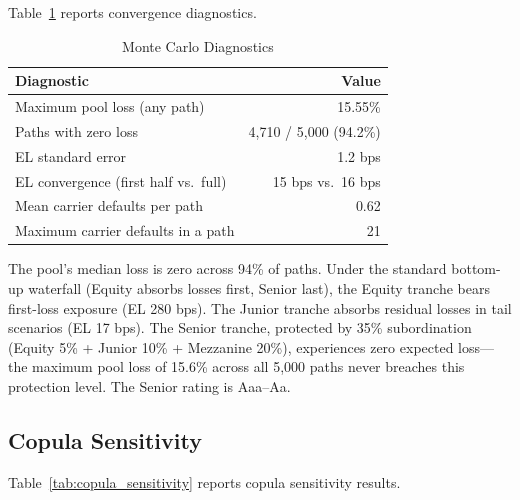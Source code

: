\documentclass[12pt,a4paper]{article}
\begin{document}
Table~\ref{tab:mc_diagnostics} reports convergence diagnostics.

\begin{table}[H]
\centering
\caption{Monte Carlo Diagnostics}
\label{tab:mc_diagnostics}
\begin{tabular}{lr}
\toprule
\textbf{Diagnostic} & \textbf{Value} \\
\midrule
Maximum pool loss (any path) & 15.55\% \\
Paths with zero loss & 4,710 / 5,000 (94.2\%) \\
EL standard error & 1.2 bps \\
EL convergence (first half vs.\ full) & 15 bps vs.\ 16 bps \\
Mean carrier defaults per path & 0.62 \\
Maximum carrier defaults in a path & 21 \\
\bottomrule
\end{tabular}
\end{table}

The pool's median loss is zero across 94\% of paths. Under the standard bottom-up waterfall (Equity absorbs losses first, Senior last), the Equity tranche bears first-loss exposure (EL 280 bps). The Junior tranche absorbs residual losses in tail scenarios (EL 17 bps). The Senior tranche, protected by 35\% subordination (Equity 5\% + Junior 10\% + Mezzanine 20\%), experiences zero expected loss---the maximum pool loss of 15.6\% across all 5,000 paths never breaches this protection level. The Senior rating is Aaa--Aa.

\subsection{Copula Sensitivity}

Table~\ref{tab:copula_sensitivity} reports copula sensitivity results.

\begin{table}[H]
\centering
\caption{Copula Sensitivity Analysis}
\label{tab:copula_sensitivity}
\end{table}
\end{document}
